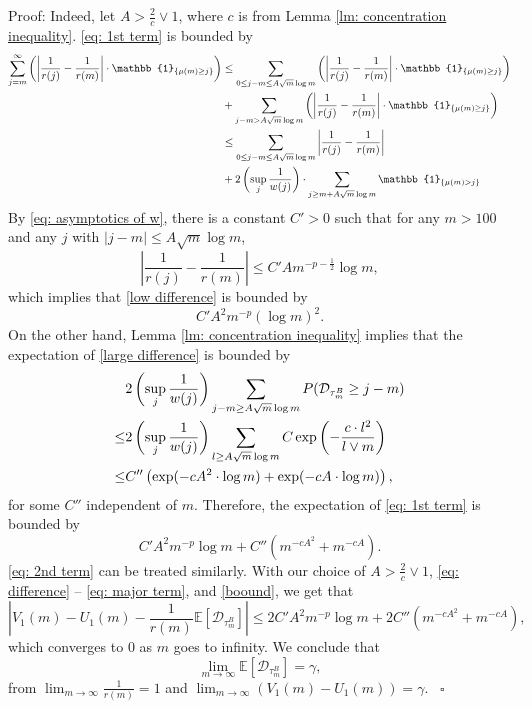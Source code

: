 \documentclass[twoside,12pt,a4paper]{article}
\numberwithin{equation}{section}
\newenvironment{proof}[1][Proof]{{\sc #1}:}{~\hfill $\square$}
\newcommand{\abs}[1]{\left\vert #1 \right\vert}
\begin{document}
\begin{proof}
		Indeed, let $A> \frac{2}{c} \vee 1$, where $c$ is from Lemma \ref{lm: concentration inequality}. \eqref{eq: 1st term} is bounded by
		\begin{align}
			\sum_{j=m}^{\infty} \left(\abs{\frac{1}{r(j)} -\frac{1}{r(m)} } \cdot \mathbb{1}_{\{\mu(m)\geq j \}}\right) & \leq  \sum_{0\leq j-m \leq A \sqrt{m}\log m } \left(\abs{\frac{1}{r(j)} -\frac{1}{r(m)} } \cdot \mathbb{1}_{\{\mu(m)\geq j \}}\right) 
			\notag
			\\
			& +  \sum_{j-m > A\sqrt{m}\log m } \left(\abs{\frac{1}{r(j)} -\frac{1}{r(m)} } \cdot \mathbb{1}_{\{\mu(m)\geq j \}}\right)
			\notag
			\\
			&\leq  \sum_{0\leq j-m \leq A\sqrt{m}\log m } \abs{\frac{1}{r(j)} -\frac{1}{r(m)} }
			\label{low difference}
			\\
			& + 2\left(\sup_j \frac{1}{w(j)}\right) \cdot \sum_{j\geq m + A\sqrt{m}\log m } \mathbb{1}_{\{ \mu(m) > j \}}
			\label{large difference}
		\end{align}
		By \eqref{eq: asymptotics of w}, there is a constant $C'>0$ such that for any $m>100 $ and any $j$ with $\abs{j-m}\leq A \sqrt m \log m $, 
		$$ \abs{\frac{1}{r(j)} -\frac{1}{r(m)} } \leq C' A m^{-p-\frac{1}{2}} \log m, $$
		which implies that \eqref{low difference} is bounded by
		$$
		C' A^2 m^{-p} (\log m)^2.
		$$ On the other hand, Lemma \ref{lm: concentration inequality} implies that the expectation of \eqref{large difference} is bounded by
		\begin{align*}
			& 2\left(\sup_j \frac{1}{w(j)}\right) \sum_{j-m \geq A \sqrt m \log m  } P( \mathcal{D}_{\tau^B_m} \geq j-m )  
			\notag 
			\\
			\leq& 2\left(\sup_j \frac{1}{w(j)}\right) \sum_{l \geq A \sqrt m \log m } C \exp\left( - \frac{c  \cdot l^2}{l \vee m}   \right)
			\notag\\
			\leq& C'' \left( \exp (- cA^2 \cdot \log m ) + \exp(-cA \cdot \log m) \right), 
		\end{align*} for some $C''$ independent of $m$. Therefore, the expectation of \eqref{eq: 1st term} is bounded by
		\begin{equation}\label{boound}
			C' A^2 m^{-p} \log m + C''  \left( m ^{-cA^2} +  m^{-cA} \right). 
		\end{equation}
		\eqref{eq: 2nd term} can be treated similarly. With our choice of $A >\frac{2}{c} \vee 1$,
		\eqref{eq: difference} -- 
		\eqref{eq: major term}, and \eqref{boound}, we get that
		$$ \abs{ V_1(m)- U_1(m) -\frac{1}{r(m)}\mathbb{E}\left[ \mathcal{D}_{\tau^B_m} \right] }
		\leq 2C' A^2 m^{-p} \log m + 2C''  \left( m ^{-cA^2} +  m^{-cA} \right), 
		$$ which converges to $0$ as $m$ goes to infinity. We conclude that 
		$$
		\lim_{m\to\infty}\mathbb{E}\left[ \mathcal{D}_{\tau^B_m} \right] = \gamma, 
		$$ from $\lim_{m\to\infty}\frac{1}{r(m)} =1$ and $ \lim_{m\to \infty} \left(V_1(m)-U_1(m) \right) = \gamma$.
	\end{proof}
\end{document}
